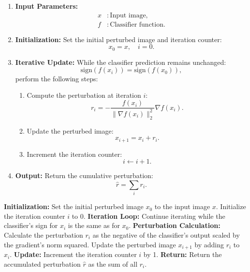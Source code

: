 \begin{enumerate}
    \item \textbf{Input Parameters:}  
    \begin{align*}
    x &: \text{Input image}, \\
    f &: \text{Classifier function}.
    \end{align*}

    \item \textbf{Initialization:}  
    Set the initial perturbed image and iteration counter:
    \[
    x_0 = x, \quad i = 0.
    \]

    \item \textbf{Iterative Update:}  
    While the classifier prediction remains unchanged:
    \[
    \text{sign}(f(x_i)) = \text{sign}(f(x_0)),
    \]
    perform the following steps:
    \begin{enumerate}
        \item Compute the perturbation at iteration $i$:
        \[
        r_i = -\frac{f(x_i)}{\|\nabla f(x_i)\|_2^2} \nabla f(x_i).
        \]
        \item Update the perturbed image:
        \[
        x_{i+1} = x_i + r_i.
        \]
        \item Increment the iteration counter:
        \[
        i \gets i + 1.
        \]
    \end{enumerate}

    \item \textbf{Output:}  
    Return the cumulative perturbation:
    \[
    \hat{r} = \sum_i r_i.
    \]
\end{enumerate}

\textbf{Initialization:} 
Set the initial perturbed image $x_0$ to the input image $x$. 
Initialize the iteration counter $i$ to 0.
\textbf{Iteration Loop:} 
Continue iterating while the classifier's sign for $x_i$ is the same as for $x_0$.
\textbf{Perturbation Calculation:}
Calculate the perturbation $r_i$ as the negative of the classifier's output scaled by the gradient's norm squared. 
Update the perturbed image $x_{i+1}$ by adding $r_i$ to $x_i$.
\textbf{Update:} 
Increment the iteration counter $i$ by 1.
\textbf{Return:}
Return the accumulated perturbation $\hat{r}$ as the sum of all $r_i$.